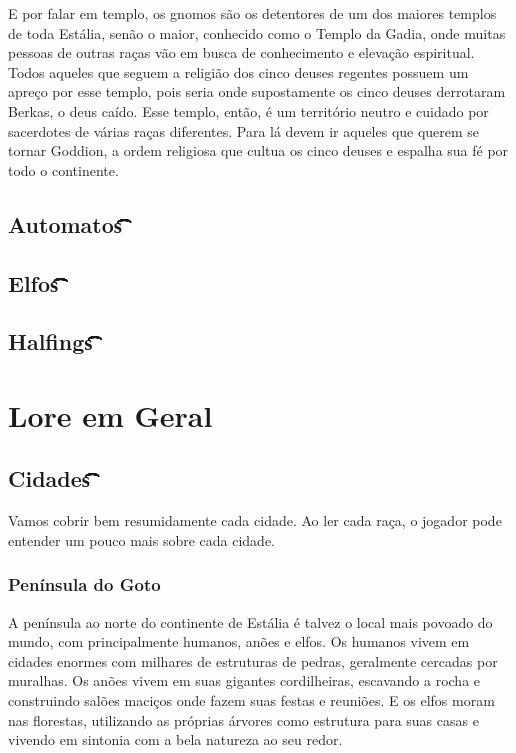 \documentclass{RPG_Adventure}[2021/10/20]
\begin{document}
E por falar em templo, os gnomos são os detentores de um dos maiores templos de
toda Estália, senão o maior, conhecido como o Templo da Gadia, onde muitas
pessoas de outras raças vão em busca de conhecimento e elevação espiritual.
Todos aqueles que seguem a religião dos cinco deuses regentes possuem um apreço
por esse templo, pois seria onde supostamente os cinco deuses derrotaram Berkas,
o deus caído. Esse templo, então, é um território neutro e cuidado por
sacerdotes de várias raças diferentes. Para lá devem ir aqueles que querem se
tornar Goddion, a ordem religiosa que cultua os cinco deuses e espalha sua fé
por todo o continente.

\section*{Automatos\t\t\t\t\t\t\t\t\t\t\t\t}%
\label{sec:automatos}


\section*{Elfos\t\t\t\t\t\t\t\t\t\t\t\t\t\t\t}%
\label{sec:elfos}

\section*{Halfings\t\t\t\t\t\t\t\t\t\t\t\t\t}%
\label{sec:halfings}


\chapter{Lore em Geral}%
\label{cha:lore_em_geral}

\section{Cidades\t\t\t\t\t\t\t\t\t\t\t\t}%
\label{sec:cidades}

Vamos cobrir bem resumidamente cada cidade. Ao ler cada raça, o jogador pode
entender um pouco mais sobre cada cidade.

\subsection{Península do Goto}%
\label{sub:peninsula_do_goto}

A península ao norte do continente de Estália é talvez o local mais povoado do
mundo, com principalmente humanos, anões e elfos. Os humanos vivem em cidades
enormes com milhares de estruturas de pedras, geralmente cercadas por muralhas.
Os anões vivem em suas gigantes cordilheiras, escavando a rocha e construindo
salões maciços onde fazem suas festas e reuniões. E os elfos moram nas
florestas, utilizando as próprias árvores como estrutura para suas casas e
vivendo em sintonia com a bela natureza ao seu redor.
\end{document}
